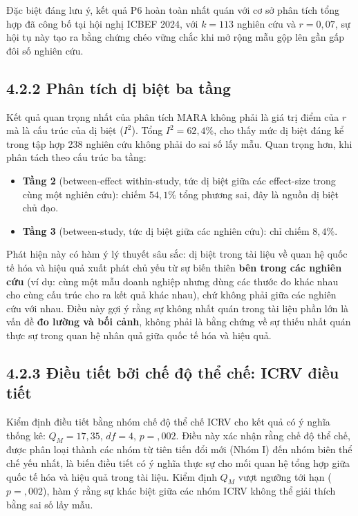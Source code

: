 \documentclass[
  a4paper,
  13pt]{extreport}
\providecommand{\tightlist}{%
  \setlength{\itemsep}{0pt}\setlength{\parskip}{0pt}}
\begin{document}
Đặc biệt đáng lưu ý, kết quả P6 hoàn toàn nhất quán với cơ sở phân tích
tổng hợp đã công bố tại hội nghị ICBEF 2024, với \(k = 113\) nghiên cứu
và \(r = 0{,}07\), sự hội tụ này tạo ra bằng chứng chéo vững chắc khi mở
rộng mẫu gộp lên gần gấp đôi số nghiên cứu.

\hypertarget{phuxe2n-tuxedch-dux1ecb-biux1ec7t-ba-tux1ea7ng}{%
\subsection{4.2.2 Phân tích dị biệt ba
tầng}\label{phuxe2n-tuxedch-dux1ecb-biux1ec7t-ba-tux1ea7ng}}

Kết quả quan trọng nhất của phân tích MARA không phải là giá trị điểm
của \(r\) mà là cấu trúc của dị biệt (\(I^2\)). Tổng \(I^2 = 62{,}4\%\),
cho thấy mức dị biệt đáng kể trong tập hợp 238 nghiên cứu không phải do
sai số lấy mẫu. Quan trọng hơn, khi phân tách theo cấu trúc ba tầng:

\begin{itemize}
\tightlist
\item
  \textbf{Tầng 2} (between-effect within-study, tức dị biệt giữa các
  effect-size trong cùng một nghiên cứu): chiếm \(54{,}1\%\) tổng phương
  sai, đây là nguồn dị biệt chủ đạo.
\item
  \textbf{Tầng 3} (between-study, tức dị biệt giữa các nghiên cứu): chỉ
  chiếm \(8{,}4\%\).
\end{itemize}

Phát hiện này có hàm ý lý thuyết sâu sắc: dị biệt trong tài liệu về quan
hệ quốc tế hóa và hiệu quả xuất phát chủ yếu từ sự biến thiên
\textbf{bên trong các nghiên cứu} (ví dụ: cùng một mẫu doanh nghiệp
nhưng dùng các thước đo khác nhau cho cùng cấu trúc cho ra kết quả khác
nhau), chứ không phải giữa các nghiên cứu với nhau. Điều này gợi ý rằng
sự không nhất quán trong tài liệu phần lớn là vấn đề \textbf{đo lường và
bối cảnh}, không phải là bằng chứng về sự thiếu nhất quán thực sự trong
quan hệ nhân quả giữa quốc tế hóa và hiệu quả.

\hypertarget{ux111iux1ec1u-tiux1ebft-bux1edfi-chux1ebf-ux111ux1ed9-thux1ec3-chux1ebf-icrv-ux111iux1ec1u-tiux1ebft}{%
\subsection{4.2.3 Điều tiết bởi chế độ thể chế: ICRV điều
tiết}\label{ux111iux1ec1u-tiux1ebft-bux1edfi-chux1ebf-ux111ux1ed9-thux1ec3-chux1ebf-icrv-ux111iux1ec1u-tiux1ebft}}

Kiểm định điều tiết bằng nhóm chế độ thể chế ICRV cho kết quả có ý nghĩa
thống kê: \(Q_M = 17{,}35\), \(df = 4\), \(p = {,}002\). Điều này xác
nhận rằng chế độ thể chế, được phân loại thành các nhóm từ tiên tiến đổi
mới (Nhóm I) đến nhóm biên thể chế yếu nhất, là biến điều tiết có ý
nghĩa thực sự cho mối quan hệ tổng hợp giữa quốc tế hóa và hiệu quả
trong tài liệu. Kiểm định \(Q_M\) vượt ngưỡng tới hạn (\(p = {,}002\)),
hàm ý rằng sự khác biệt giữa các nhóm ICRV không thể giải thích bằng sai
số lấy mẫu.
\end{document}

